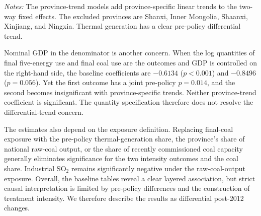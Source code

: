 \documentclass[11pt]{article}
\newcommand{\note}[1]{\begin{minipage}{0.96\textwidth}\footnotesize\textit{Notes:} #1\end{minipage}}
\begin{document}
\begin{table}[H]
\centering
\caption{Event-study and differential-trend diagnostics}
\label{tab:diagnostics}
\note{The province-trend models add province-specific linear trends to the two-way fixed effects. The excluded provinces are Shanxi, Inner Mongolia, Shaanxi, Xinjiang, and Ningxia. Thermal generation has a clear pre-policy differential trend.}
\end{table}

Nominal GDP in the denominator is another concern. When the log quantities of final five-energy use and final coal use are the outcomes and GDP is controlled on the right-hand side, the baseline coefficients are $-0.6134$ ($p<0.001$) and $-0.8496$ ($p=0.056$). Yet the first outcome has a joint pre-policy $p=0.014$, and the second becomes insignificant with province-specific trends. Neither province-trend coefficient is significant. The quantity specification therefore does not resolve the differential-trend concern.

The estimates also depend on the exposure definition. Replacing final-coal exposure with the pre-policy thermal-generation share, the province's share of national raw-coal output, or the share of recently commissioned coal capacity generally eliminates significance for the two intensity outcomes and the coal share. Industrial SO$_2$ remains significantly negative under the raw-coal-output exposure. Overall, the baseline tables reveal a clear layered association, but strict causal interpretation is limited by pre-policy differences and the construction of treatment intensity. We therefore describe the results as differential post-2012 changes.
\end{document}
